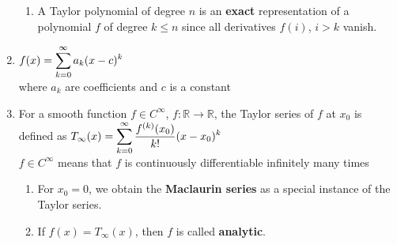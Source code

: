 \begin{enumerate}
\begin{enumerate}
        \item A Taylor polynomial of degree $n$ is an \textbf{exact} representation of a polynomial $f$ of degree $k \leq n$ since all derivatives $f (i)$, $i > k$ vanish. 
        \hfill \cite{mfml/book/mml/Deisenroth-Faisal-Ong}
    \end{enumerate}


    \item 
    \begin{definition}
        $
            f(x) = \displaystyle\sum_{k=0}^{\infty} a_k (x-c)^k
        $
        \\
        where $a_k$ are coefficients and $c$ is a constant
    \end{definition}


    \item 
    \begin{definition}
        For a smooth function $f \in C^{\infty}$, $f : \mathbb{R} \to \mathbb{R}$, the Taylor series of $f$ at $x_0$ is defined as
        $
            T_{\infty}(x)
            = \displaystyle\sum_{k=0}^{\infty} \dfrac{f^{(k)}(x_0)}{k!} (x - x_0)^k
        $
        \hfill \cite{mfml/book/mml/Deisenroth-Faisal-Ong}
        \\
         $f \in C^{\infty}$ means that $f$ is continuously differentiable infinitely many times
         \hfill \cite{mfml/book/mml/Deisenroth-Faisal-Ong}
    \end{definition}
    \begin{enumerate}
        \item 
        \begin{definition}        
            For $x_0 = 0$, we obtain the \textbf{Maclaurin series} as a special instance of the Taylor series. 
            \hfill \cite{mfml/book/mml/Deisenroth-Faisal-Ong}
        \end{definition}

        \item 
        \begin{definition}[Analytic]        
            If $f (x) = T_{\infty}(x)$, then $f$ is called \textbf{analytic}.
            \hfill \cite{mfml/book/mml/Deisenroth-Faisal-Ong}
        \end{definition}
    \end{enumerate}
\end{enumerate}


















